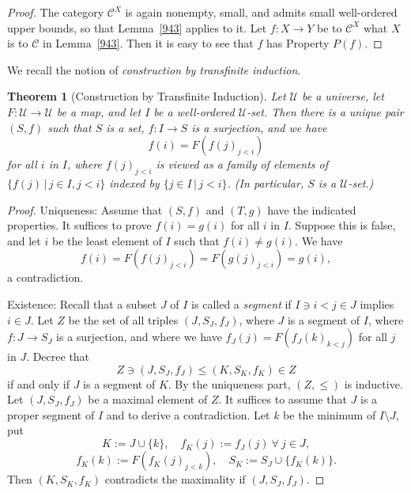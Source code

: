 \documentclass[12pt]{article}%
\newtheorem{thm}{Theorem}%
\theoremstyle{remark}
\theoremstyle{definition}
\newcommand{\C}{\mathcal C}
\newcommand{\U}{\mathcal U}
\begin{document}
\begin{proof}
The category $\C^X$ is again nonempty, small, and admits small well-ordered upper bounds, so that Lemma~\ref{943} applies to it. Let $f:X\to Y$ be to $\C^X$ what $X$ is to $\C$ in Lemma~\ref{943}. Then it is easy to see that $f$ has Property $P(f)$. 
\end{proof}

We recall the notion of {\em construction by transfinite induction}. 

\begin{thm}[Construction by Transfinite Induction]\label{meta} 
Let $\U$ be a universe, let $F:\U\to\U$ be a map, and let $I$ be a well-ordered $\U$-set. Then there is a unique pair $(S,f)$ such that $S$ is a set, $f:I\to S$ is a surjection, and we have $$
f(i)=F(f(j)_{j<i})
$$ 
for all $i$ in $I$, where $f(j)_{j<i}$ is viewed as a family of elements of $\{f(j)\,|\,j\in I,j<i\}$ indexed by $\{j\in I\,|\,j<i\}$. (In particular, $S$ is a $\U$-set.)
\end{thm}

\begin{proof}
Uniqueness: Assume that $(S,f)$ and $(T,g)$ have the indicated properties. It suffices to prove $f(i)=g(i)$ for all $i$ in $I$. Suppose this is false, and let $i$ be the least element of $I$ such that $f(i)\neq g(i)$. We have 
$$
f(i)=F(f(j)_{j<i})=F(g(j)_{j<i})=g(i),
$$ 
a contradiction. 

Existence: Recall that a subset $J$ of $I$ is called a {\em segment} if $I\ni i<j\in J$ implies $i\in J$. Let $Z$ be the set of all triples $(J,S_J,f_J)$, where $J$ is a segment of $I$, where $f:J\to S_J$ is a surjection, and where we have $f_J(j)=F(f_J(k)_{k<j})$ for all $j$ in $J$. Decree that 
$$
Z\ni(J,S_J,f_J)\le(K,S_K,f_K)\in Z
$$ 
if and only if $J$ is a segment of $K$. By the uniqueness part, $(Z,\le)$ is inductive. Let $(J,S_J,f_J)$ be a maximal element of $Z$. It suffices to assume that $J$ is a proper segment of $I$ and to derive a contradiction. Let $k$ be the minimum of $I\setminus J$, put 
$$
K:=J\cup\{k\},\quad f_K(j):=f_J(j)\ \forall\ j\in J,
$$
$$
f_K(k):=F(f_K(j)_{j<k}),\quad S_K:=S_J\cup\{f_K(k)\}.
$$ 
Then $(K,S_K,f_K)$ contradicts the maximality if $(J,S_J,f_J)$. 
\end{proof}
\end{document}
